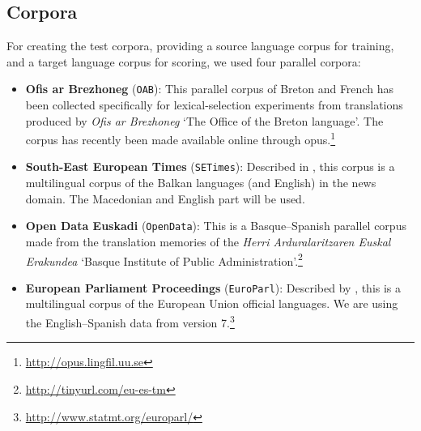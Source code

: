 \documentclass[11pt]{article}
\begin{document}
\subsection{Corpora}
\label{sec:eval-corpus}

For creating the test corpora, providing a source language corpus 
for training, and a target language corpus for scoring, we used four parallel corpora: 
\begin{itemize}
\addtolength{\itemsep}{-0.10in}
\item \textbf{Ofis ar Brezhoneg} (\texttt{OAB}): This parallel corpus
  of Breton and French has been collected specifically for
  lexical-selection experiments from translations produced by
  \emph{Ofis ar Brezhoneg} `The Office of the Breton
  language'. %
The corpus has recently been made available online through {\sc opus}.\footnote{\url{http://opus.lingfil.uu.se}}
\item \textbf{South-East European Times} (\texttt{SETimes}): Described
  in \cite{tyers10}, this corpus is a multilingual corpus of the
  Balkan languages (and English) in the news domain. The Macedonian and English
  part will be used.%
\item \textbf{Open Data Euskadi} (\texttt{OpenData}): This is a
  Basque--Spanish parallel corpus made from the translation
  memories of the \emph{Herri Arduralaritzaren Euskal Erakundea}
  `Basque Institute of Public
  Administration'.\footnote{\url{http://tinyurl.com/eu-es-tm}}
\item \textbf{European Parliament Proceedings} (\texttt{EuroParl}):
  Described by \cite{koehn05a}, this is a multilingual corpus of the
  European Union official languages. We are using the English--Spanish
  data from version 7.\footnote{\url{http://www.statmt.org/europarl/}}
\end{itemize}
\end{document}
